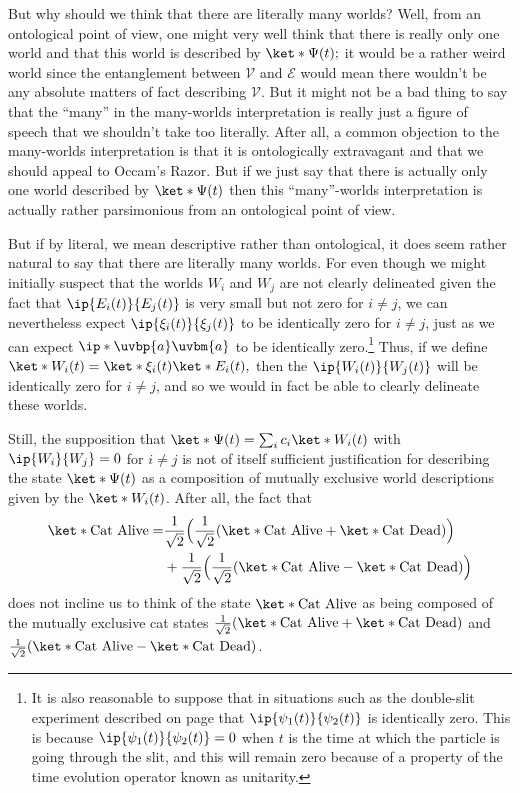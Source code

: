 \documentclass[12pt]{report}
\begin{document}
    But why should we think that there are literally many worlds? Well, from an ontological point of view, one might very well think that there is really only one world and that this world is described by $\ket*{\Psi(t)};$ it would be a rather weird world since the entanglement between $\mathcal{V}$ and $\mathcal{E}$ would mean there wouldn't be any absolute matters of fact describing $\mathcal{V}$. But it might not be a bad thing to say that the ``many'' in the many-worlds interpretation is really just a figure of speech that we shouldn't take too literally. After all, a common objection to the many-worlds interpretation is that it is ontologically extravagant and that we should appeal to Occam's Razor. But if we just say that there is actually only one world described by $\ket*{\Psi(t)}$ then this ``many''-worlds interpretation is actually rather parsimonious from an ontological point of view. 
    
    But if by literal, we mean descriptive rather than ontological, it does seem rather natural to say that there are literally many worlds. For even though we might initially suspect that the worlds $W_i$ and $W_j$ are not clearly delineated given the fact that $\ip{E_i(t)}{E_j(t)}$ is very small but not zero for $i\neq j$, we can nevertheless expect $\ip{\xi_i(t)}{\xi_j(t)}$ to be identically zero for $i\neq j$, just as we can expect $\ip*{\uvbp{a}}{\uvbm{a}}$ to be identically zero.\footnote{It is also reasonable to suppose that in situations such as the double-slit experiment described on page \pageref{psi_slit} that $\ip{\psi_1(t)}{\psi_2(t)}$ is identically zero. This is because $\ip{\psi_1(t)}{\psi_2(t)}=0$ when $t$ is the time at which the particle is going through the slit, and this will remain zero because of a property of the time evolution operator known as unitarity.} Thus, if we define $\ket*{W_i(t)}=\ket*{\xi_i(t)}\ket*{E_i(t)},$ then the $\ip{W_i(t)}{W_j(t)}$ will be identically zero for $i\neq j$, and so we would in fact be able to clearly delineate these worlds.
    
    Still, the supposition that $\ket*{\Psi(t)}= \sum_i c_i\ket*{W_i(t)}$  with $\ip{W_i}{W_j}=0$ for $i\neq j$ is not of itself sufficient justification for describing the state $\ket*{\Psi(t)}$ as a composition of mutually exclusive world descriptions given by the $\ket*{W_i(t)}$. After all, the fact that
    \begin{align*}\ket*{\text{Cat Alive}}= &\frac{1}{\sqrt{2}}\Big(\frac{1}{\sqrt{2}}(\ket*{\text{Cat Alive}}+\ket*{\text{Cat Dead}})\Big)\\&+\frac{1}{\sqrt{2}}\Big( \frac{1}{\sqrt{2}}(\ket*{\text{Cat Alive}}-\ket*{\text{Cat Dead}})\Big) \end{align*} does not incline us to think of the state $\ket*{\text{Cat Alive}}$ as being composed of the mutually exclusive cat states  $\frac{1}{\sqrt{2}}(\ket*{\text{Cat Alive}}+\ket*{\text{Cat Dead}})$ and $\frac{1}{\sqrt{2}}(\ket*{\text{Cat Alive}}-\ket*{\text{Cat Dead}})$. 
    
\end{document}
